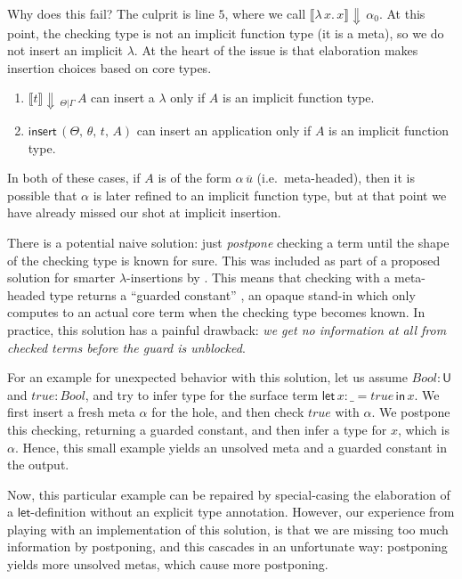 \documentclass[acmsmall,review,anonymous,prologue,dvipsnames]{acmart}\settopmatter{printfolios=true,printccs=false,printacmref=false}
\newcommand{\slet}{\boldsymbol{\mathsf{let}}}
\renewcommand{\sin}{\boldsymbol{\mathsf{in}}}
\renewcommand{\U}{\mathsf{U}}
\newcommand{\mi}[1]{\mathit{#1}}
\newcommand{\echeck}[4]{\llbracket#1\rrbracket\!\Downarrow\,_{#2|#3}\,#4}
\newcommand{\echeckt}[2]{\llbracket#1\rrbracket\!\Downarrow\,#2}
\newcommand{\einsert}{\mathsf{insert}}
\theoremstyle{remark}
\begin{document}
Why does this fail? The culprit is line $\scriptstyle{5}$, where we call
$\echeckt{\lambda\,x.\,x}{\alpha_0}$. At this point, the checking type is not an
implicit function type (it is a meta), so we do not insert an implicit
$\lambda$. At the heart of the issue is that elaboration makes insertion choices
based on core types.
\begin{enumerate}
\item $\echeck{t}{\Theta}{\Gamma}{A}$ can insert a $\lambda$ only if $A$ is an implicit function type.
\item $\einsert\,(\Theta,\,\theta,\,t,\,A)$ can insert an application only if
  $A$ is an implicit function type.
\end{enumerate}
In both of these cases, if $A$ is of the form $\alpha\,\overline{u}$
(i.e.\ meta-headed), then it is possible that $\alpha$ is later refined to an
implicit function type, but at that point we have already missed our shot at
implicit insertion.

There is a potential naive solution: just \emph{postpone} checking a term until
the shape of the checking type is known for sure. This was included as part of a
proposed solution for smarter $\lambda$-insertions by
\cite{johansson2015eliminating}. This means that checking with a meta-headed
type returns a ``guarded constant'' \cite[Chapter~3]{norell07thesis}, an opaque
stand-in which only computes to an actual core term when the checking type
becomes known. In practice, this solution has a painful drawback: \emph{we get
  no information at all from checked terms before the guard is unblocked}.

For an example for unexpected behavior with this solution, let us assume $\mi{Bool} :
\U$ and $\mi{true} : \mi{Bool}$, and try to infer type for the surface term $\slet\,x : \_
= \mi{true}\,\sin\, x$. We first insert a fresh meta $\alpha$ for the hole, and then
check $\mi{true}$ with $\alpha$. We postpone this checking, returning a guarded
constant, and then infer a type for $x$, which is $\alpha$. Hence, this small
example yields an unsolved meta and a guarded constant in the output.

Now, this particular example can be repaired by special-casing the elaboration
of a $\slet$-definition without an explicit type annotation. However, our
experience from playing with an implementation of this solution, is that we are
missing too much information by postponing, and this cascades in an unfortunate
way: postponing yields more unsolved metas, which cause more postponing.
\end{document}

